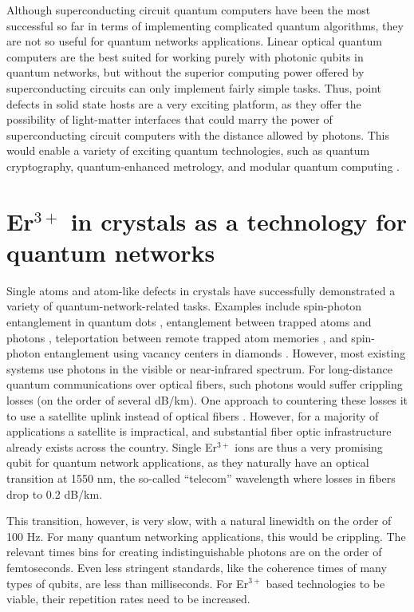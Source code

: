 \documentclass[12pt]{puthesis}
\newcommand{\erbium}[1][ ]{Er$^{3+}$#1}
\begin{document}
Although superconducting circuit quantum computers have been the most successful so far in terms of implementing complicated quantum algorithms, they are not so useful for quantum networks applications. Linear optical quantum computers are the best suited for working purely with photonic qubits in quantum networks, but without the superior computing power offered by superconducting circuits can only implement fairly simple tasks. Thus, point defects in solid state hosts are a very exciting platform, as they offer the possibility of light-matter interfaces that could marry the power of superconducting circuit computers with the distance allowed by photons. This would enable a variety of exciting quantum technologies, such as quantum cryptography, quantum-enhanced metrology, and modular quantum computing \cite{Monroe2014}.

\section{\erbium in crystals as a technology for quantum networks }
\label{sec:erbium-crystals-as}

Single atoms and atom-like defects in crystals have successfully demonstrated a variety of quantum-network-related tasks. Examples include spin-photon entanglement in quantum dots \cite{Greve2012}, entanglement between trapped atoms and photons \cite{Blinov2004}, teleportation between remote trapped atom memories \cite{Nolleke2013}, and spin-photon entanglement using vacancy centers in diamonds \cite{Togan2010}. However, most existing systems use photons in the visible or near-infrared spectrum. For long-distance quantum communications over optical fibers, such photons would suffer crippling losses (on the order of several dB/km). One approach to countering these losses it to use a satellite uplink instead of optical fibers \cite{Yin2017}. However, for a majority of applications a satellite is impractical, and substantial fiber optic infrastructure already exists across the country. Single \erbium ions are thus a very promising qubit for quantum network applications, as they naturally have an optical transition at 1550 nm, the so-called ``telecom'' wavelength where losses in fibers drop to 0.2 dB/km.

This transition, however, is very slow, with a natural linewidth on the order of 100 Hz. For many quantum networking applications, this would be crippling. The relevant times bins for creating indistinguishable photons are on the order of femtoseconds. Even less stringent standards, like the coherence times of many types of qubits, are less than milliseconds. For \erbium based technologies to be viable, their repetition rates need to be increased. 
\end{document}
